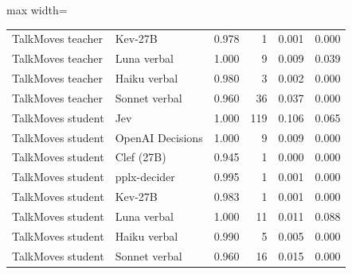 \begin{table}[t]
\begin{adjustbox}{max width=\linewidth}
\begin{tabular}{llrrrr}
TalkMoves teacher & Kev-27B & 0.978 & 1 & 0.001 & 0.000 \\
TalkMoves teacher & Luna verbal & 1.000 & 9 & 0.009 & 0.039 \\
TalkMoves teacher & Haiku verbal & 0.980 & 3 & 0.002 & 0.000 \\
TalkMoves teacher & Sonnet verbal & 0.960 & 36 & 0.037 & 0.000 \\
TalkMoves student & Jev & 1.000 & 119 & 0.106 & 0.065 \\
TalkMoves student & OpenAI Decisions & 1.000 & 9 & 0.009 & 0.000 \\
TalkMoves student & Clef (27B) & 0.945 & 1 & 0.000 & 0.000 \\
TalkMoves student & pplx-decider & 0.995 & 1 & 0.001 & 0.000 \\
TalkMoves student & Kev-27B & 0.983 & 1 & 0.001 & 0.000 \\
TalkMoves student & Luna verbal & 1.000 & 11 & 0.011 & 0.088 \\
TalkMoves student & Haiku verbal & 0.990 & 5 & 0.005 & 0.000 \\
TalkMoves student & Sonnet verbal & 0.960 & 16 & 0.015 & 0.000 \\
\bottomrule
\end{tabular}
\end{adjustbox}
\end{table}

